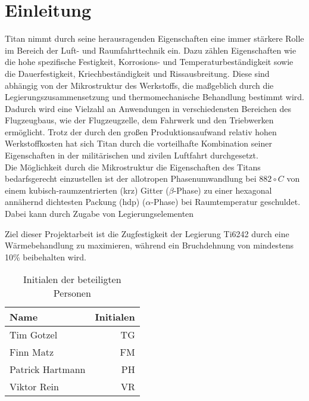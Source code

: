 \chapter{Einleitung}
Titan nimmt durch seine herausragenden Eigenschaften eine immer stärkere Rolle im Bereich der Luft- und Raumfahrttechnik ein. Dazu zählen Eigenschaften wie die hohe spezifische Festigkeit, Korrosions- und Temperaturbeständigkeit sowie die Dauerfestigkeit, Kriechbeständigkeit und Rissausbreitung. Diese sind abhängig von der Mikrostruktur des Werkstoffs, die maßgeblich durch die Legierungszusammensetzung und thermomechanische Behandlung bestimmt wird. Dadurch wird eine Vielzahl an Anwendungen in verschiedensten Bereichen des Flugzeugbaus, wie der Flugzeugzelle, dem Fahrwerk und den Triebwerken ermöglicht. Trotz der durch den großen Produktionsaufwand relativ hohen Werkstoffkosten hat sich Titan durch die vorteilhafte Kombination seiner Eigenschaften in der militärischen und zivilen Luftfahrt durchgesetzt. \\
Die Möglichkeit durch die Mikrostruktur die Eigenschaften des Titans bedarfsgerecht einzustellen ist der allotropen Phasenumwandlung bei $882\circ C$ von einem kubisch-raumzentrierten (krz) Gitter ($\beta$-Phase) zu einer hexagonal annähernd dichtesten Packung (hdp) ($\alpha$-Phase) bei Raumtemperatur geschuldet. Dabei kann durch Zugabe von Legierungselementen 


Ziel dieser Projektarbeit ist die Zugfestigkeit der Legierung Ti6242 durch eine Wärmebehandlung zu maximieren, während ein Bruchdehnung von mindestens 10\% beibehalten wird. 

\begin{table}[h]
	\centering
	\begin{tabular}{lr}
		
		Name & \hspace{0.5cm} Initialen\\
		\hline
		Tim Gotzel & TG\\
		Finn Matz & FM\\
		Patrick Hartmann & PH \\
		Viktor Rein & VR\\
		\hline
		
	\end{tabular}
	\caption{Initialen der beteiligten Personen}
	\label{tab:initialien}
\end{table}
